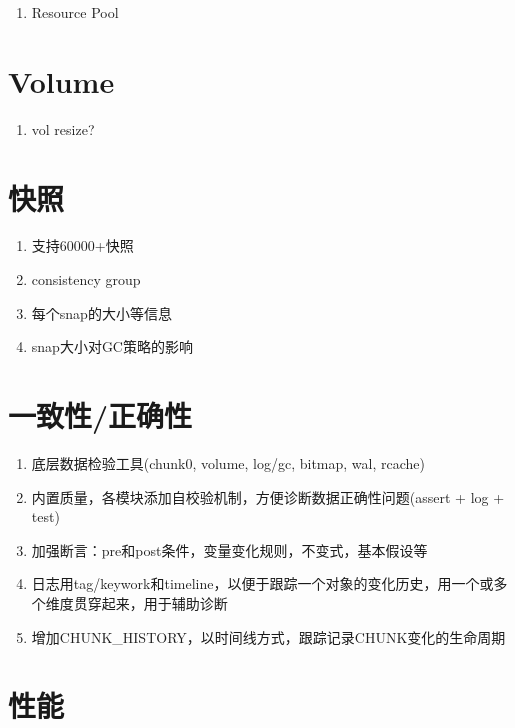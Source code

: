 \begin{enumerate}
    \item Resource Pool
\end{enumerate}

\section{Volume}

\begin{enumerate}
    \item vol resize?
\end{enumerate}

\section{快照}

\begin{enumerate}
    \item 支持60000+快照
    \item consistency group
    \item 每个snap的大小等信息
    \item snap大小对GC策略的影响
\end{enumerate}

\section{一致性/正确性}

\begin{tcolorbox}
\begin{enumerate}
    \item 底层数据检验工具(chunk0, volume, log/gc, bitmap, wal, rcache)
    \item 内置质量，各模块添加自校验机制，方便诊断数据正确性问题(assert + log + test)
    \item 加强断言：pre和post条件，变量变化规则，不变式，基本假设等
    \item 日志用tag/keywork和timeline，以便于跟踪一个对象的变化历史，用一个或多个维度贯穿起来，用于辅助诊断
    \item 增加CHUNK\_HISTORY，以时间线方式，跟踪记录CHUNK变化的生命周期
\end{enumerate}
\end{tcolorbox}

\section{性能}

